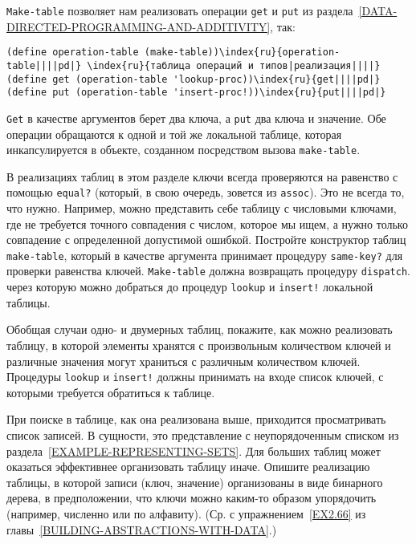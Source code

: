 {\tt Make-table} позволяет нам реализовать
операции {\tt get} и {\tt put} из
раздела~\ref{DATA-DIRECTED-PROGRAMMING-AND-ADDITIVITY}, так:

{\small
\begin{Verbatim}[fontsize=\small]
(define operation-table (make-table))\index{ru}{operation-table||||pd|} \index{ru}{таблица операций и типов|реализация||||}
(define get (operation-table 'lookup-proc))\index{ru}{get||||pd|}
(define put (operation-table 'insert-proc!))\index{ru}{put||||pd|}
\end{Verbatim}
}
{\tt Get} в качестве аргументов берет два ключа, а
{\tt put} два ключа и значение.  Обе операции обращаются к
одной и той же локальной таблице, которая инкапсулируется в объекте,
созданном посредством вызова {\tt make-table}.
\begin{exercise}{3.24}\label{EX3.24}%
%
%
В реализациях таблиц в этом разделе ключи всегда
проверяются на равенство с помощью {\tt equal?} (который, в
свою очередь, зовется из {\tt assoc}).  Это не всегда то, что
нужно.  Например, можно представить себе таблицу с числовыми ключами,
где не требуется точного совпадения с числом, которое мы ищем, а
нужно только совпадение с определенной допустимой ошибкой.  Постройте
конструктор таблиц {\tt make-table}, который в качестве
аргумента принимает процедуру {\tt same-key?} для проверки
равенства ключей.  {\tt Make-table} должна возвращать процедуру
{\tt dispatch}. через которую можно добраться до процедур
{\tt lookup} и {\tt insert!} локальной таблицы.
\end{exercise}
\begin{exercise}{3.25}\label{EX3.25}%
Обобщая случаи
одно- и двумерных таблиц, покажите, как
можно реализовать таблицу, в которой элементы хранятся с произвольным
количеством ключей и различные значения могут храниться с различным
количеством ключей. Процедуры {\tt lookup} и
{\tt insert!} должны принимать на входе список ключей, с
которыми требуется обратиться к таблице.
\end{exercise}
\begin{exercise}{3.26}\label{EX3.26}%
При поиске в таблице, как она реализована выше,
приходится просматривать список записей.  В сущности, это
представление с неупорядоченным списком из
раздела~\ref{EXAMPLE-REPRESENTING-SETS}.  Для больших таблиц может
оказаться эффективнее организовать таблицу иначе.  Опишите реализацию
 таблицы, в которой записи
(ключ, значение) организованы в виде
бинарного дерева, в предположении, что ключи можно каким-то образом
упорядочить (например, численно или по алфавиту). (Ср. с
упражнением~\ref{EX2.66} из
главы~\ref{BUILDING-ABSTRACTIONS-WITH-DATA}.)
\end{exercise}
